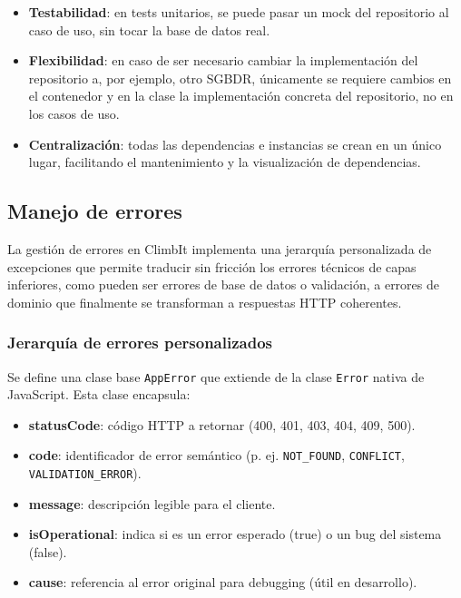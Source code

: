 \begin{itemize}
  \item \textbf{Testabilidad}: en tests unitarios, se puede pasar un mock del repositorio al caso de uso, sin tocar la base de datos real.
  \item \textbf{Flexibilidad}:  en caso de ser necesario cambiar la implementación del repositorio a, por ejemplo, otro SGBDR, únicamente 
  se requiere cambios en el contenedor y en la clase la implementación concreta del repositorio, no en los casos de uso.
  \item \textbf{Centralización}: todas las dependencias e instancias se crean en un único lugar, facilitando el mantenimiento y la visualización de dependencias.
\end{itemize}

\subsection{Manejo de errores}

La gestión de errores en ClimbIt implementa una jerarquía personalizada de excepciones que permite traducir sin fricción los errores técnicos de capas inferiores, como pueden ser errores de base de datos o validación, a errores de dominio que finalmente se transforman a respuestas HTTP coherentes.

\subsubsection*{Jerarquía de errores personalizados}

Se define una clase base \texttt{AppError} que extiende de la clase \texttt{Error} nativa de JavaScript. Esta clase encapsula:

\begin{itemize}
  \item \textbf{statusCode}: código HTTP a retornar (400, 401, 403, 404, 409, 500).
  \item \textbf{code}: identificador de error semántico (p. ej. \texttt{NOT\_FOUND}, \texttt{CONFLICT}, \texttt{VALIDATION\_ERROR}).
  \item \textbf{message}: descripción legible para el cliente.
  \item \textbf{isOperational}: indica si es un error esperado (true) o un bug del sistema (false).
  \item \textbf{cause}: referencia al error original para debugging (útil en desarrollo).
\end{itemize}

